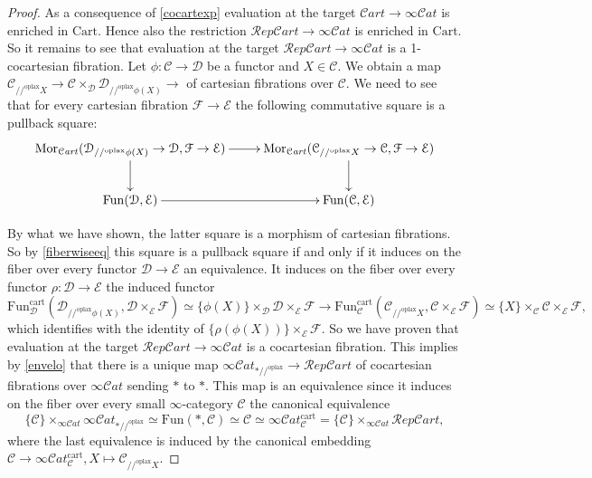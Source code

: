\documentclass[10pt,oneside]{article}
\numberwithin{equation}{section} %
\numberwithin{figure}{section} %
\theoremstyle{plain}
\theoremstyle{definition}
\newcommand{\mC}{{\mathcal C}}
\newcommand{\mD}{{\mathcal D}}
\newcommand{\mE}{{\mathcal E}}
\newcommand{\mF}{{\mathcal F}}
\newcommand{\Fun}{\mathrm{Fun}}
\newcommand{\cart}{{\mathrm{cart}}}
\newcommand{\Cart}{{\mathrm{Cart}}}
\newcommand{\oplax}{{\mathrm{oplax}}}
\newcommand{\Mor}{{\mathrm{Mor}}}
\newcommand{\scat}{\mathcal{C}\mathit{at}}
\begin{document}
\begin{proof}

As a consequence of \ref{cocartexp} evaluation at the target $\mathcal{C}\mathit{art} \to \infty\scat$
is enriched in $\Cart. $
Hence also the restriction $\mathcal{R}\mathit{ep}\mathcal{C}\mathit{art} \to \infty\scat$ is enriched in $\Cart. $ So it remains to see that evaluation at the target $\mathcal{R}\mathit{ep}\mathcal{C}\mathit{art} \to \infty\scat$ is a 1-cocartesian fibration.
Let $\phi: \mC \to \mD$ be a functor and $X \in \mC$.
We obtain a map $\mC_{//^\oplax X} \to \mC \times_\mD \mD_{//^\oplax \phi(X)} \to $ of cartesian fibrations over $\mC$.
We need to see that for every cartesian fibration $\mF \to \mE$
the following commutative square is a pullback square:
$$
\begin{xy}
\xymatrix{
\Mor_{\mathcal{C}\mathit{art}}(\mD_{//^\oplax \phi(X)} \to \mD,\mF \to \mE) \ar[d] \ar[r]
& \Mor_{\mathcal{C}\mathit{art}}(\mC_{//^\oplax X} \to \mC,\mF \to \mE) \ar[d]
\\ 
\Fun(\mD,\mE) \ar[r] & \Fun(\mC,\mE)
}
\end{xy}$$

By what we have shown, the latter square is a morphism of cartesian fibrations. So by \cref{fiberwiseeq} this square is a pullback square if and only if it induces on the fiber over every functor $\mD \to \mE$ an equivalence.
It induces on the fiber over every functor $\rho: \mD \to \mE$ the induced functor 
$$ \Fun^\cart_\mD(\mD_{//^\oplax \phi(X)},\mD \times_\mE \mF) \simeq 
\{ \phi(X) \} \times_\mD \mD \times_\mE \mF \to \Fun^\cart_\mC(\mC_{//^\oplax X},\mC \times_\mE \mF) \simeq \{X\} \times_\mC \mC \times_\mE \mF, $$
which identifies with the identity of $\{ \rho(\phi(X)) \} \times_\mE \mF $.
So we have proven that evaluation at the target $\mathcal{R}\mathit{ep}\mathcal{C}\mathit{art} \to \infty\scat$ is a cocartesian fibration.
This implies by \cref{envelo} that there is a unique map $\infty\scat_{*//^\oplax}\to \mathcal{R}\mathit{ep}\mathcal{C}\mathit{art}$ of cocartesian fibrations
over $\infty\scat$ sending $* $ to $*$.
This map is an equivalence since it induces on the fiber over every small $\infty$-category $\mC$ the canonical equivalence
$$ \{\mC\} \times_{\infty\scat} \infty\scat_{*//^\oplax } \simeq \Fun(*,\mC) \simeq \mC \simeq \infty\scat^\cart_\mC = \{\mC\} \times_{\infty\scat} \mathcal{R}\mathit{ep}\mathcal{C}\mathit{art}, $$
where the last equivalence is induced by the canonical embedding
$ \mC \to \infty\scat^\cart_\mC, X \mapsto \mC_{//^\oplax X}.$
\end{proof}
\end{document}
